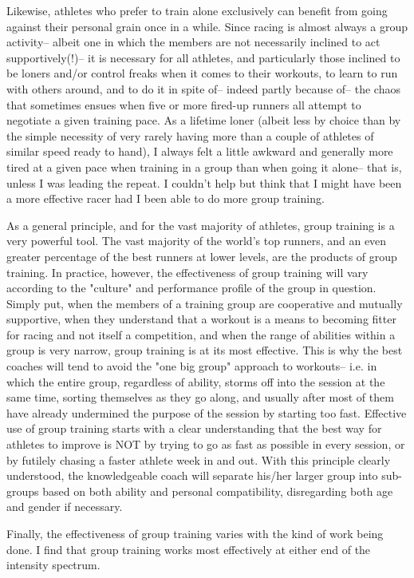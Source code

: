 Likewise, athletes who prefer to train alone exclusively can benefit from going against their personal grain once in a while. Since racing is almost always a group activity-- albeit one in which the members are not necessarily inclined to act supportively(!)-- it is necessary for all athletes, and particularly those inclined to be loners and/or control freaks when it comes to their workouts, to learn to run with others around, and to do it in spite of-- indeed partly because of-- the chaos that sometimes ensues when five or more fired-up runners all attempt to negotiate a given training pace. As a lifetime loner (albeit less by choice than by the simple necessity of very rarely having more than a couple of athletes of similar speed ready to hand), I always felt a little awkward and generally more tired at a given pace when training in a group than when going it alone-- that is, unless I was leading the repeat. I couldn't help but think that I might have been a more effective racer had I been able to do more group training.

As a general principle, and for the vast majority of athletes, group training is a very powerful tool. The vast majority of the world's top runners, and an even greater percentage of the best runners at lower levels, are the products of group training. In practice, however, the effectiveness of group training will vary according to the "culture" and performance profile of the group in question. Simply put, when the members of a training group are cooperative and mutually supportive, when they understand that a workout is a means to becoming fitter for racing and not itself a competition, and when the range of abilities within a group is very narrow, group training is at its most effective. This is why the best coaches will tend to avoid the "one big group" approach to workouts-- i.e. in which the entire group, regardless of ability, storms off into the session at the same time, sorting themselves as they go along, and usually after most of them have already undermined the purpose of the session by starting too fast. Effective use of group training starts with a clear understanding that the best way for athletes to improve is NOT by trying to go as fast as possible in every session, or by futilely chasing a faster athlete week in and out. With this principle clearly understood, the knowledgeable coach will separate his/her larger group into sub-groups based on both ability and personal compatibility, disregarding both age and gender if necessary.

Finally, the effectiveness of group training varies with the kind of work being done. I find that group training works most effectively at either end of the intensity spectrum.

